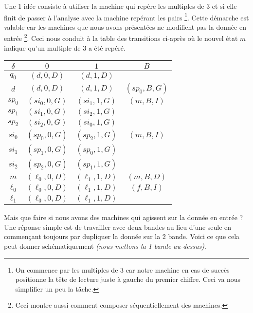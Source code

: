 Une 1\iere{} idée consiste à utiliser la machine qui repère les multiples de $3$ et si elle finit de passer à l'analyse avec la machine repérant les pairs
\footnote{
	On commence par les multiples de $3$ car notre machine en cas de succès positionne la tête de lecture juste à gauche du premier chiffre. Ceci va nous simplifier un peu la tâche.
}.
Cette démarche est valable car les machines que nous avons présentées ne modifient pas la donnée en entrée
\footnote{
	Ceci montre aussi comment composer séquentiellement des machines.
}.
Ceci nous conduit à la table des transitions ci-après où le nouvel état $m$ indique qu'un multiple de $3$ a été repéré.

\begin{center}
	\begin{tabular}{|c||c|c|c|}
		\hline
		$\delta$ 
			& $0$ 
			& $1$
			& $B$ \\
		\hline
		\hline
		$q_0$ 
			& $(d , 0, D)$ 
			& $(d , 1, D)$
			&  \\
		\hline
		$d$ 
			& $(d , 0, D)$ 
			& $(d , 1, D)$
			& $(sp_0, B, G)$ \\
		\hline
		\hline
		$sp_0$ 
			& $(si_0 , 0, G)$ 
			& $(si_1 , 1, G)$
			& $(m    , B, I)$ \\
		\hline
		$sp_1$ 
			& $(si_1 , 0, G)$ 
			& $(si_2 , 1, G)$
			&                 \\
		\hline
		$sp_2$ 
			& $(si_2 , 0, G)$ 
			& $(si_0 , 1, G)$
			&                 \\
		\hline
		\hline
		$si_0$ 
			& $(sp_0 , 0, G)$ 
			& $(sp_2 , 1, G)$
			& $(m    , B, I)$ \\
		\hline
		$si_1$ 
			& $(sp_1 , 0, G)$ 
			& $(sp_0 , 1, G)$
			&                 \\
		\hline
		$si_2$ 
			& $(sp_2 , 0, G)$ 
			& $(sp_1 , 1, G)$
			&                 \\
		\hline
		\hline
		$m$
			& $(\ell_0 , 0 , D)$
			& $(\ell_1 , 1 , D)$
			& $(m      , B , D)$ \\
		\hline
		\hline
		$\ell_0$
			& $(\ell_0 , 0 , D)$
			& $(\ell_1 , 1 , D)$
			& $(f      , B , I)$ \\
		\hline
		$\ell_1$
			& $(\ell_0 , 0 , D)$
			& $(\ell_1 , 1 , D)$
			&                    \\
		\hline
	\end{tabular}
\end{center}


Mais que faire si nous avons des machines qui agissent sur la donnée en entrée ?
Une réponse simple est de travailler avec deux bandes au lieu d'une seule en commençant toujours par dupliquer la donnée sur la 2\ieme{} bande.
Voici ce que cela peut donner schématiquement \emph{(nous mettons la 1\iere{} bande au-dessus)}.

